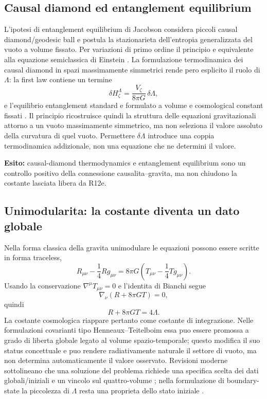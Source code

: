 \documentclass[11pt,a4paper]{article}
\begin{document}
\subsection{Causal diamond ed entanglement equilibrium}

L'ipotesi di entanglement equilibrium di Jacobson considera piccoli causal diamond/geodesic ball e postula la stazionarieta dell'entropia generalizzata del vuoto a volume fissato. Per variazioni di primo ordine il principio e equivalente alla equazione semiclassica di Einstein \cite{Jacobson2015}. La formulazione termodinamica dei causal diamond in spazi massimamente simmetrici rende pero esplicito il ruolo di $\Lambda$: la first law contiene un termine
\begin{equation}
 \delta H_\zeta^{\Lambda}=\frac{V_\zeta}{8\pi G}\,\delta\Lambda,
 \label{eq:r12f_diamond_lambda_work}
\end{equation}
e l'equilibrio entanglement standard e formulato a volume e cosmological constant fissati \cite{JacobsonVisser2019}. Il principio ricostruisce quindi la struttura delle equazioni gravitazionali attorno a un vuoto massimamente simmetrico, ma non seleziona il valore assoluto della curvatura di quel vuoto. Permettere $\delta\Lambda$ introduce una coppia termodinamica addizionale, non una equazione che ne determini il valore.

\textbf{Esito:} causal-diamond thermodynamics e entanglement equilibrium sono un controllo positivo della connessione causalita--gravita, ma non chiudono la costante lasciata libera da R12e.

\subsection{Unimodularita: la costante diventa un dato globale}

Nella forma classica della gravita unimodulare le equazioni possono essere scritte in forma traceless,
\begin{equation}
 R_{\mu\nu}-\frac14Rg_{\mu\nu}
 =8\pi G\left(T_{\mu\nu}-\frac14Tg_{\mu\nu}\right).
 \label{eq:r12f_unimodular_traceless}
\end{equation}
Usando la conservazione $\nabla^\mu T_{\mu\nu}=0$ e l'identita di Bianchi segue
\begin{equation}
 \nabla_\nu\left(R+8\pi G T\right)=0,
\end{equation}
quindi
\begin{equation}
 \boxed{R+8\pi G T=4\Lambda.}
 \label{eq:r12f_unimodular_constant}
\end{equation}
La costante cosmologica riappare pertanto come costante di integrazione. Nelle formulazioni covarianti tipo Henneaux--Teitelboim essa puo essere promossa a grado di liberta globale legato al volume spazio-temporale; questo modifica il suo status concettuale e puo rendere radiativamente naturale il settore di vuoto, ma non determina automaticamente il valore osservato. Revisioni moderne sottolineano che una soluzione del problema richiede una specifica scelta dei dati globali/iniziali e un vincolo sul quattro-volume \cite{Jirousek2023}; nella formulazione di boundary-state la piccolezza di $\Lambda$ resta una proprieta dello stato iniziale \cite{BuchmullerDragon2022}.
\end{document}
